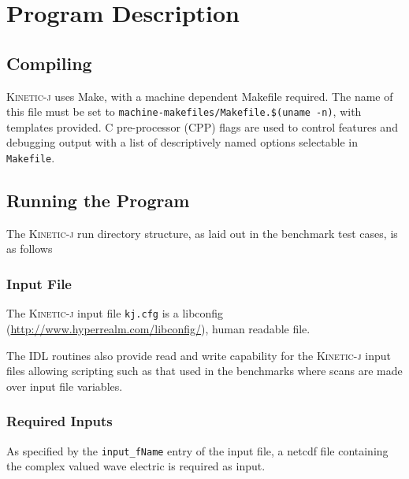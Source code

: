 \documentclass[final,5p,times,twocolumn]{elsarticle}
\newcommand{\kj}{\textsc{Kinetic-j}\xspace}
\begin{document}
\section{Program Description}
\label{section:program}
%
\subsection{Compiling}
\label{section:compiling}
%
\kj uses Make, with a machine dependent Makefile required. The name of this file must be set to \texttt{machine-makefiles/Makefile.\$(uname -n)}, with templates provided. C pre-processor (CPP) flags are used to control features and debugging output with a list of descriptively named options selectable in \texttt{Makefile}. 

\subsection{Running the Program}
\label{section:running}
%
The \kj run directory structure, as laid out in the benchmark test cases, is as follows

\subsubsection{Input File}
\label{section:input_file}
The \kj input file \texttt{kj.cfg} is a libconfig (\url{http://www.hyperrealm.com/libconfig/}), human readable file. 
%
 
%
The IDL routines also provide read and write capability for the \kj input files allowing scripting such as that used in the benchmarks where scans are made over input file variables.  
%
\subsubsection{Required Inputs}
\label{section:inputs}
As specified by the \lstinline{input_fName} entry of the input file, a netcdf file containing the complex valued wave electric is required as input. 
 
%
\end{document}
